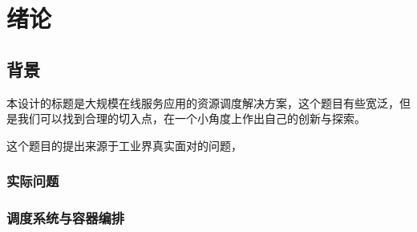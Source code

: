 
\section{绪论}

\subsection{背景}

本设计的标题是大规模在线服务应用的资源调度解决方案，这个题目有些宽泛，但是我们可以找到合理的切入点，在一个小角度上作出自己的创新与探索。

这个题目的提出来源于工业界真实面对的问题，

\subsubsection{实际问题}

\subsubsection{调度系统与容器编排}

\subsubsection{}

\subsubsection{}
